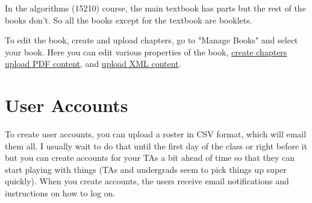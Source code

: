 \begin{example}
In the algorithms (15210) course, the main textbook has parts but
the rest of the books don't.  So all the books except for the textbook are booklets.
\end{example}


\begin{gram}
To edit the book, create and upload chapters, go to "Manage Books" and select your book.  Here you can edit various properties of the book, 
%
\href{guide:chapter::create}{create chapters}
%
\href{guide:chapter::upload-pdf}{upload PDF content}, and
\href{guide:chapter::upload-xml}{upload XML content}.
\end{gram}


\section{User Accounts} 

\begin{gram}[Creation]
To create user accounts, you can upload a roster in CSV format, which will email them all.  
%
I usually wait to do that until the first day of the class or right before it but you can create accounts for your TAs a bit ahead of time so that they can start playing with things (TAs and undergrads seem to pick things up super quickly).  When you create accounts, the users receive email notifications and instructions on how to log on.
\end{gram}

